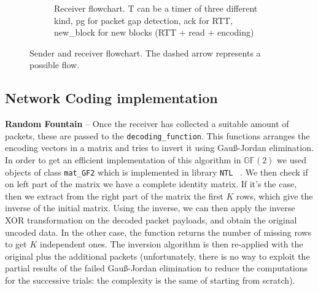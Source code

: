 \begin{sidewaysfigure}
\begin{subfigure}{0.5\hsize}
	\caption{Receiver flowchart. T can be a timer of three different kind, pg for packet gap detection, ack for RTT, new\_block for new blocks (RTT + read + encoding)}
	\label{fig:receiver}

\end{subfigure}

\caption{Sender and receiver flowchart. The dashed arrow represents a possible flow.}
\label{fig:flowchart}
\end{sidewaysfigure}

\subsection{Network Coding implementation}
\textbf{Random Fountain} -- Once the receiver has collected a suitable amount of packets, these are passed to the \texttt{decoding\_function}. This functions arranges the encoding vectors in a matrix and tries to invert it using Gau{\ss}-Jordan elimination. In order to get an efficient implementation of this algorithm in $\mathds{G}\mathds{F}(2)$ we used objects of class \texttt{mat\_GF2} which is implemented in library \texttt{NTL} ~\cite{NTL}. We then check if on left part of the matrix we have a complete identity matrix. If it's the case, then we extract from the right part of the matrix the first $K$ rows, which give the inverse of the initial matrix. Using the inverse, we can then apply the inverse XOR transformation on the decoded packet payloads, and obtain the original uncoded data. In the other case, the function returns the number of missing rows to get $K$ independent ones. The inversion algorithm is then re-applied with the original plus the additional packets (unfortunately, there is no way to exploit the partial results of the failed Gau{\ss}-Jordan elimination to reduce the computations for the successive trials: the complexity is the same of starting from scratch).

